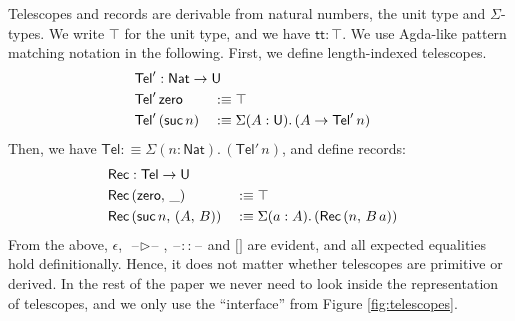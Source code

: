 \documentclass[acmsmall,screen,dvipsnames]{acmart}\settopmatter{}
\renewcommand{\U}{\mathsf{U}}
\newcommand{\blank}{\mathord{\hspace{1pt}\text{--}\hspace{1pt}}}
\renewcommand{\tt}{\mathsf{tt}}
\newcommand{\Nat}{\mathsf{Nat}}
\newcommand{\zero}{\mathsf{zero}}
\newcommand{\suc}{\mathsf{suc}}
\newcommand{\Tel}{\mathsf{Tel}}
\newcommand{\TCons}{\triangleright}
\newcommand{\Rec}{\mathsf{Rec}}
\theoremstyle{remark}
\begin{document}
Telescopes and records are derivable from natural numbers, the unit type and
$\Sigma$-types. We write $\top$ for the unit type, and we have $\tt : \top$. We
use Agda-like pattern matching notation in the following.  First, we define
length-indexed telescopes.
\begin{alignat*}{3}
  & \rlap{$\Tel' : \Nat \to \U$}\\
  & \Tel'\,\zero      && :\equiv \top\\
  & \Tel'\,(\suc\,n)  && :\equiv \Sigma(A : \U).\,(A \to \Tel'\,n)
\end{alignat*}
Then, we have $\Tel :\equiv \Sigma(n : \Nat).\,(\Tel'\,n)$, and define records:
\begin{alignat*}{3}
  & \rlap{$\Rec : \Tel \to \U$}\\
  & \Rec\,(\zero,\,\_)        &&:\equiv \top\\
  & \Rec\,(\suc\,n,\,(A,\,B)) &&:\equiv \Sigma(a : A).\,(\Rec\,(n,\,B\,a))
\end{alignat*}
From the above, $\epsilon$, $\blank\TCons\blank$, $\blank::\blank$ and ${[}{]}$
are evident, and all expected equalities hold definitionally. Hence, it does not
matter whether telescopes are primitive or derived. In the rest of the paper we never
need to look inside the representation of telescopes, and we only use the ``interface''
from Figure \ref{fig:telescopes}.
\end{document}
